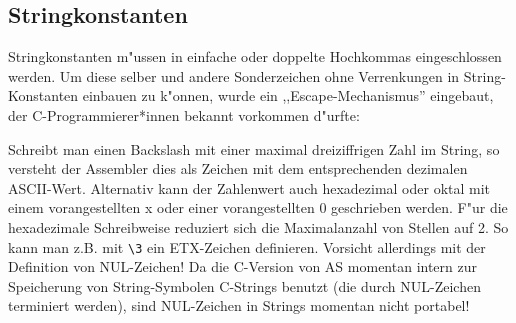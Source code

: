 \documentclass[12pt,a4paper,twoside]{report}
\newcommand{\asname}{AS}
\begin{document}
\subsection{Stringkonstanten}
\label{SectStringConsts}

Stringkonstanten m"ussen in einfache oder doppelte Hochkommas
eingeschlossen werden.  Um diese selber und andere Sonderzeichen ohne
Verrenkungen in String-Konstanten einbauen zu k"onnen, wurde ein
,,Escape-Mechanismus'' eingebaut, der C-Programmierer*innen bekannt
vorkommen d"urfte:

Schreibt man einen Backslash mit einer maximal dreiziffrigen Zahl im
String, so versteht der Assembler dies als Zeichen mit dem entsprechenden
dezimalen ASCII-Wert.  Alternativ kann der Zahlenwert auch hexadezimal
oder oktal mit einem vorangestellten x oder einer vorangestellten 0
geschrieben werden.  F"ur die hexadezimale Schreibweise reduziert sich die
Maximalanzahl von Stellen auf 2.  So kann man z.B. mit {\tt\verb!\3!} ein
ETX-Zeichen definieren.  Vorsicht allerdings mit der Definition von
NUL-Zeichen!  Da die C-Version  von \asname{} momentan
intern zur Speicherung von String-Symbolen C-Strings benutzt (die durch
NUL-Zeichen terminiert werden), sind NUL-Zeichen in Strings momentan nicht
portabel!
\end{document}
